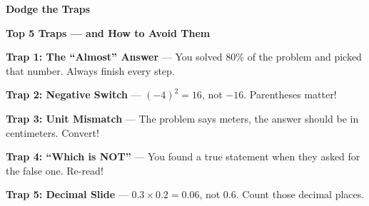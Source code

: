 \clearpage
\thispagestyle{empty}
{\sffamily

\begin{center}
{\fontsize{22}{26}\selectfont\bfseries\color{funGreen} \faShieldAlt\hspace{3mm}Dodge the Traps\hspace{3mm}\faShieldAlt}

\vspace{2mm}
{\color{funGray}\hrulefill}
\end{center}

\vspace{3mm}

\begin{tcolorbox}[
    enhanced,
    colback=funGreenLight,
    colframe=funGreen!50,
    arc=10pt,
    boxrule=1.5pt,
    left=6mm, right=6mm, top=5mm, bottom=5mm,
]
{\large\bfseries\color{funGreenDark} \faExclamationTriangle\hspace{2mm}Top 5 Traps — and How to Avoid Them}

\vspace{3mm}

\textcolor{funGreen}{\faArrowRight}\hspace{2mm}\textbf{Trap 1: The ``Almost'' Answer} — You solved 80\% of the problem and picked that number. Always finish every step.

\vspace{2mm}

\textcolor{funGreen}{\faArrowRight}\hspace{2mm}\textbf{Trap 2: Negative Switch} — $(-4)^2 = 16$, not $-16$. Parentheses matter!

\vspace{2mm}

\textcolor{funGreen}{\faArrowRight}\hspace{2mm}\textbf{Trap 3: Unit Mismatch} — The problem says meters, the answer should be in centimeters. Convert!

\vspace{2mm}

\textcolor{funGreen}{\faArrowRight}\hspace{2mm}\textbf{Trap 4: ``Which is NOT''} — You found a true statement when they asked for the false one. Re-read!

\vspace{2mm}

\textcolor{funGreen}{\faArrowRight}\hspace{2mm}\textbf{Trap 5: Decimal Slide} — $0.3 \times 0.2 = 0.06$, not $0.6$. Count those decimal places.
\end{tcolorbox}

}
